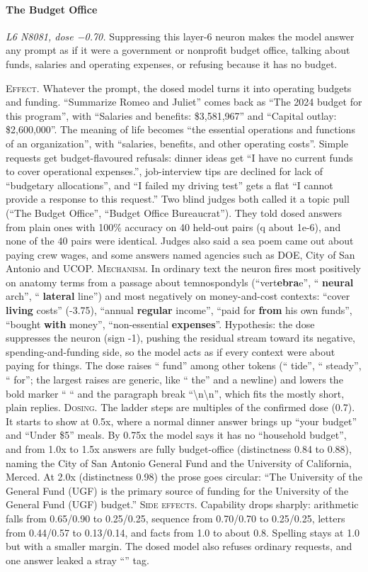 \paragraph{The Budget Office} \textit{L6 N8081, dose −0.70.} Suppressing this layer-6 neuron makes the model answer any prompt as if it were a government or nonprofit budget office, talking about funds, salaries and operating expenses, or refusing because it has no budget.

\noindent\textsc{Effect.} Whatever the prompt, the dosed model turns it into operating budgets and funding. “Summarize Romeo and Juliet” comes back as “The 2024 budget for this program”, with “Salaries and benefits: \$3,581,967” and “Capital outlay: \$2,600,000”. The meaning of life becomes “the essential operations and functions of an organization”, with “salaries, benefits, and other operating costs”. Simple requests get budget-flavoured refusals: dinner ideas get “I have no current funds to cover operational expenses.”, job-interview tips are declined for lack of “budgetary allocations”, and “I failed my driving test” gets a flat “I cannot provide a response to this request.” Two blind judges both called it a topic pull (“The Budget Office”, “Budget Office Bureaucrat”). They told dosed answers from plain ones with 100\% accuracy on 40 held-out pairs (q about 1e-6), and none of the 40 pairs were identical. Judges also said a sea poem came out about paying crew wages, and some answers named agencies such as DOE, City of San Antonio and UCOP. \textsc{Mechanism.} In ordinary text the neuron fires most positively on anatomy terms from a passage about temnospondyls (“vert\textbf{ebra}e”, “\textbf{ neural} arch”, “\textbf{ lateral} line”) and most negatively on money-and-cost contexts: “cover \textbf{living} costs” (-3.75), “annual \textbf{regular} income”, “paid for \textbf{from} his own funds”, “bought \textbf{with} money”, “non-essential \textbf{expenses}”. Hypothesis: the dose suppresses the neuron (sign -1), pushing the residual stream toward its negative, spending-and-funding side, so the model acts as if every context were about paying for things. The dose raises “ fund” among other tokens (“ tide”, “ steady”, “ for”; the largest raises are generic, like “ the” and a newline) and lowers the bold marker “ “ and the paragraph break “\textbackslash{}n\textbackslash{}n”, which fits the mostly short, plain replies. \textsc{Dosing.} The ladder steps are multiples of the confirmed dose (0.7). It starts to show at 0.5x, where a normal dinner answer brings up “your budget” and “Under \$5” meals. By 0.75x the model says it has no “household budget”, and from 1.0x to 1.5x answers are fully budget-office (distinctness 0.84 to 0.88), naming the City of San Antonio General Fund and the University of California, Merced. At 2.0x (distinctness 0.98) the prose goes circular: “The University of the General Fund (UGF) is the primary source of funding for the University of the General Fund (UGF) budget.” \textsc{Side effects.} Capability drops sharply: arithmetic falls from 0.65/0.90 to 0.25/0.25, sequence from 0.70/0.70 to 0.25/0.25, letters from 0.44/0.57 to 0.13/0.14, and facts from 1.0 to about 0.8. Spelling stays at 1.0 but with a smaller margin. The dosed model also refuses ordinary requests, and one answer leaked a stray “” tag.

